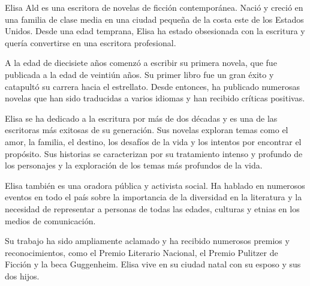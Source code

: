 

Elisa Ald es una escritora de novelas de ficción contemporánea. Nació y creció en una familia de clase media en una ciudad pequeña de la costa este de los Estados Unidos. Desde una edad temprana, Elisa ha estado obsesionada con la escritura y quería convertirse en una escritora profesional.

A la edad de diecisiete años comenzó a escribir su primera novela, que fue publicada a la edad de veintiún años. Su primer libro fue un gran éxito y catapultó su carrera hacia el estrellato. Desde entonces, ha publicado numerosas novelas que han sido traducidas a varios idiomas y han recibido críticas positivas.

Elisa se ha dedicado a la escritura por más de dos décadas y es una de las escritoras más exitosas de su generación. Sus novelas exploran temas como el amor, la familia, el destino, los desafíos de la vida y los intentos por encontrar el propósito. Sus historias se caracterizan por su tratamiento intenso y profundo de los personajes y la exploración de los temas más profundos de la vida.

Elisa también es una oradora pública y activista social. Ha hablado en numerosos eventos en todo el país sobre la importancia de la diversidad en la literatura y la necesidad de representar a personas de todas las edades, culturas y etnias en los medios de comunicación.

Su trabajo ha sido ampliamente aclamado y ha recibido numerosos premios y reconocimientos, como el Premio Literario Nacional, el Premio Pulitzer de Ficción y la beca Guggenheim. Elisa vive en su ciudad natal con su esposo y sus dos hijos.